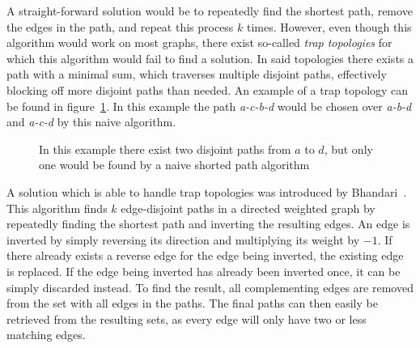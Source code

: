 A straight-forward solution would be to repeatedly find the shortest path, remove the edges in the path, and repeat this process $k$ times. However, even though this algorithm would work on most graphs, there exist so-called \textit{trap topologies} for which this algorithm would fail to find a solution. In said topologies there exists a path with a minimal sum, which traverses multiple disjoint paths, effectively blocking off more disjoint paths than needed. An example of a trap topology can be found in figure~\ref{contr:trap-topology}. In this example the path \textit{a-c-b-d} would be chosen over \textit{a-b-d} and \textit{a-c-d} by this naive algorithm.

\vspace{-0.12in}
\begin{figure}[h]
    \centering
    \caption{In this example there exist two disjoint paths from $a$ to $d$, but only one would be found by a naive shorted path algorithm}
    \label{contr:trap-topology}
\end{figure}
\vspace{-0.12in}

A solution which is able to handle trap topologies was introduced by Bhandari~\cite{bhandari}. This algorithm finds $k$ edge-disjoint paths in a directed weighted graph by repeatedly finding the shortest path and inverting the resulting edges. An edge is inverted by simply reversing its direction and multiplying its weight by $-1$. If there already exists a reverse edge for the edge being inverted, the existing edge is replaced. If the edge being inverted has already been inverted once, it can be simply discarded instead.
To find the result, all complementing edges are removed from the set with all edges in the paths. The final paths can then easily be retrieved from the resulting sets, as every edge will only have two or less matching edges.


